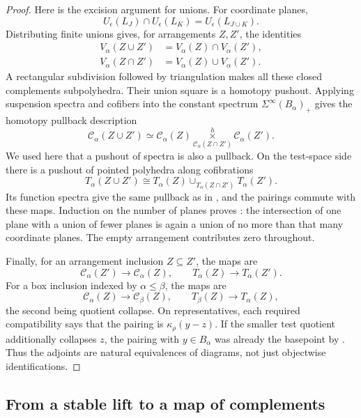 \begin{proof}
Here is the excision argument for unions.  For coordinate planes,
\[
 U_\epsilon(L_J)\cap U_\epsilon(L_K)
 =U_\epsilon(L_{J\cup K}).
\]
Distributing finite unions gives, for arrangements $Z,Z'$, the
identities
\begin{align*}
 V_\alpha(Z\cup Z')&=V_\alpha(Z)\cap V_\alpha(Z'),\\
 V_\alpha(Z\cap Z')&=V_\alpha(Z)\cup V_\alpha(Z').
\end{align*}
A rectangular subdivision followed by triangulation makes all these
closed complements subpolyhedra.  Their union square is a homotopy
pushout.  Applying suspension spectra and cofibers into the constant
spectrum $\Sigma^\infty(B_\alpha)_+$ gives the homotopy pullback
description
\begin{equation}\label{eq:cofiber-arrangement-excision}
 \mathcal C_\alpha(Z\cup Z')\simeq
 \mathcal C_\alpha(Z)
 \mathop{\times}\limits^{h}_{\mathcal C_\alpha(Z\cap Z')}
 \mathcal C_\alpha(Z').
\end{equation}
We used here that a pushout of spectra is also a pullback.
On the test-space side there is a pushout of pointed polyhedra along
cofibrations
\[
 T_\alpha(Z\cup Z')\cong
 T_\alpha(Z)\cup_{T_\alpha(Z\cap Z')}T_\alpha(Z').
\]
Its function spectra give the same pullback as in
, and the pairings commute with
these maps.  Induction on the number of planes proves
: the intersection of one plane with a union of
fewer planes is again a union of no more than that many coordinate
planes.  The empty arrangement contributes zero throughout.

Finally, for an arrangement inclusion $Z\subseteq Z'$, the maps are
\[
 \mathcal C_\alpha(Z')\longrightarrow\mathcal C_\alpha(Z),
 \qquad T_\alpha(Z)\longrightarrow T_\alpha(Z').
\]
For a box inclusion indexed by $\alpha\le\beta$, the maps are
\[
 \mathcal C_\alpha(Z)\longrightarrow\mathcal C_\beta(Z),
 \qquad T_\beta(Z)\longrightarrow T_\alpha(Z),
\]
the second being quotient collapse.  On representatives, each required
compatibility says that the pairing is $\kappa_\rho(y-z)$.  If the
smaller test quotient additionally collapses $z$, the pairing with
$y\in B_\alpha$ was already the basepoint by
.  Thus the adjoints are natural
equivalences of diagrams, not just objectwise identifications.
\end{proof}

\subsection{From a stable lift to a map of complements}

